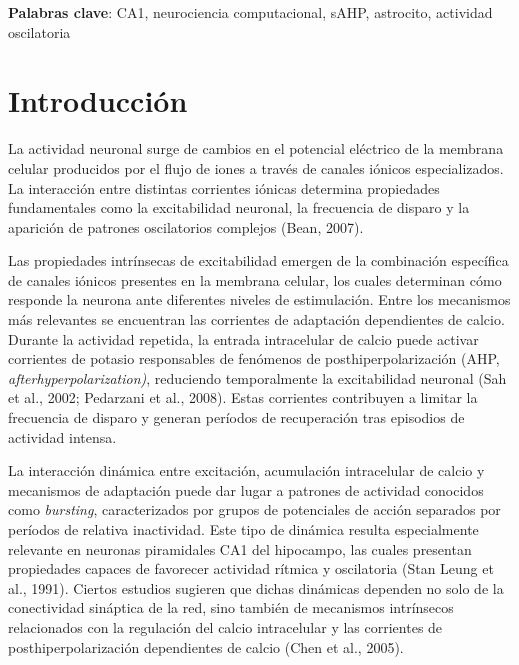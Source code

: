 \documentclass[12pt,a4paper]{report}
\begin{document}
\textbf{Palabras clave}: CA1, neurociencia computacional, sAHP, astrocito, actividad oscilatoria

\section{Introducción}
La actividad neuronal surge de cambios en el potencial eléctrico de la membrana celular producidos por el flujo de iones a través de canales iónicos especializados. La interacción entre distintas corrientes iónicas determina propiedades fundamentales como la excitabilidad neuronal, la frecuencia de disparo y la aparición de patrones oscilatorios complejos (Bean, 2007).

Las propiedades intrínsecas de excitabilidad emergen de la combinación específica de canales iónicos presentes en la membrana celular, los cuales determinan cómo responde la neurona ante diferentes niveles de estimulación. Entre los mecanismos más relevantes se encuentran las corrientes de adaptación dependientes de calcio. Durante la actividad repetida, la entrada intracelular de calcio puede activar corrientes de potasio responsables de fenómenos de posthiperpolarización (AHP, \textit{afterhyperpolarization)}, reduciendo temporalmente la excitabilidad neuronal (Sah et al., 2002; Pedarzani et al., 2008). Estas corrientes contribuyen a limitar la frecuencia de disparo y generan períodos de recuperación tras episodios de actividad intensa. 

La interacción dinámica entre excitación, acumulación intracelular de calcio y mecanismos de adaptación puede dar lugar a patrones de actividad conocidos como \textit{bursting}, caracterizados por grupos de potenciales de acción separados por períodos de relativa inactividad. Este tipo de dinámica resulta especialmente relevante en neuronas piramidales CA1 del hipocampo, las cuales presentan propiedades capaces de favorecer actividad rítmica y oscilatoria (Stan Leung et al., 1991). Ciertos estudios sugieren que dichas dinámicas dependen no solo de la conectividad sináptica de la red, sino también de mecanismos intrínsecos relacionados con la regulación del calcio intracelular y las corrientes de posthiperpolarización dependientes de calcio (Chen et al., 2005).
\end{document}
